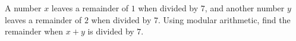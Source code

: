 A number $x$ leaves a remainder of $1$ when divided by $7$, and another number $y$ leaves a remainder of $2$ when divided by $7$. Using modular arithmetic, find the remainder when $x+y$ is divided by $7$.

